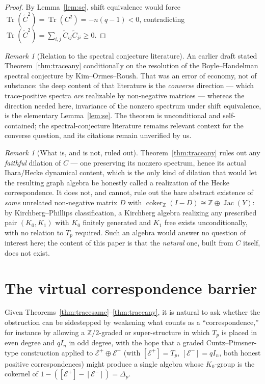 \documentclass[11pt]{amsart}
\numberwithin{equation}{section}
\theoremstyle{definition}
\theoremstyle{remark}
\newtheorem{remark}[theorem]{Remark}
\newcommand{\Z}{\mathbb{Z}}
\newcommand{\cE}{\mathcal{E}}
\newcommand{\Tr}{\operatorname{Tr}}
\newcommand{\coker}{\operatorname{coker}}
\newcommand{\Jac}{\operatorname{Jac}}
\begin{document}
\begin{proof}
By Lemma~\ref{lem:se}, shift equivalence would force
$\Tr(\widetilde C^2)=\Tr(C^2)=-n(q-1)<0$, contradicting
$\Tr(\widetilde C^2)=\sum_{i,j}\widetilde C_{ij}\widetilde C_{ji}\ge0$.
\end{proof}

\begin{remark}[Relation to the spectral conjecture literature]
An earlier draft stated Theorem~\ref{thm:traceany} conditionally on the resolution of
the Boyle--Handelman spectral conjecture by Kim--Ormes--Roush. That was an error of
economy, not of substance: the deep content of that literature is the \emph{converse}
direction --- which trace-positive spectra \emph{are} realizable by non-negative
matrices --- whereas the direction needed here, invariance of the nonzero spectrum under
shift equivalence, is the elementary Lemma~\ref{lem:se}. The theorem is unconditional
and self-contained; the spectral-conjecture literature remains relevant context for the
converse question, and its citations remain unverified by us.
\end{remark}

\begin{remark}[What is, and is not, ruled out]\label{rem:scope}
Theorem~\ref{thm:traceany} rules out any \emph{faithful} dilation of $C$ --- one
preserving its nonzero spectrum, hence its actual Ihara/Hecke dynamical content, which is
the only kind of dilation that would let the resulting graph algebra be honestly called a
realization of the Hecke correspondence. It does not, and cannot, rule out the bare
abstract existence of \emph{some} unrelated non-negative matrix $D$ with
$\coker_\Z(I-D)\cong\Z\oplus\Jac(Y)$: by Kirchberg--Phillips classification, a Kirchberg
algebra realizing any prescribed pair $(K_0,K_1)$ with $K_0$ finitely generated and $K_1$
free exists unconditionally, with no relation to $T_p$ required. Such an algebra would
answer no question of interest here; the content of this paper is that the
\emph{natural} one, built from $C$ itself, does not exist.
\end{remark}

\section{The virtual correspondence barrier}\label{sec:barrier}

Given Theorems~\ref{thm:tracesame}--\ref{thm:traceany}, it is natural to ask whether the
obstruction can be sidestepped by weakening what counts as a ``correspondence,'' for
instance by allowing a $\Z/2$-graded or super-structure in which $T_p$ is placed in even
degree and $qI_n$ in odd degree, with the hope that a graded Cuntz--Pimsner-type
construction applied to $\cE^+\oplus\cE^-$ (with $[\cE^+]=T_p$, $[\cE^-]=qI_n$, both
honest positive correspondences) might produce a single algebra whose $K_0$-group is the
cokernel of $1-([\cE^+]-[\cE^-])=\Delta_p$.
\end{document}

